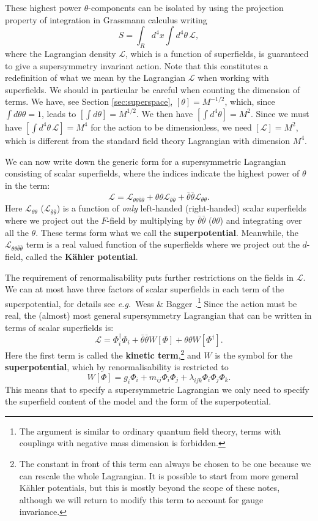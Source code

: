 \documentclass[notes.tex]{subfiles}
\begin{document}
These highest power $\theta$-components can be isolated by using the projection property of integration in Grassmann calculus writing
\[S=\int_R d^4x \int d^4\theta\, \mathcal{L},\]
where the Lagrangian density $\mathcal{L}$, which is a function of superfields, is guaranteed to give a supersymmetry invariant action. Note that this constitutes a redefinition of what we mean by the Lagrangian $\mathcal{L}$ when working with superfields. We should in particular be careful when counting the dimension of terms. We have, see Section \ref{sec:superspace}, $[\theta] = M^{-1/2}$, which, since $\int d\theta \theta=1$, leads to $[\int d\theta]=M^{1/2}$. We then have $[\int d^4\theta] = M^2$. Since we must have $[\int d^4\theta\, \mathcal{L}] = M^4$ for the action to be dimensionless, we need $[\mathcal{L}]=M^2$, which is different from the standard field theory Lagrangian with dimension $M^4$.

We can now write down the generic form for a supersymmetric Lagrangian consisting of scalar superfields, where the indices indicate the highest power of $\theta$ in the term:
\[\mathcal{L} = \mathcal{L}_{\theta \theta \bar{\theta} \bar{\theta}} + \theta\theta \mathcal{L}_{\bar{\theta}\bar{\theta}} + \bar{\theta}\bar{\theta}\mathcal{L}_{\theta\theta}.\]
Here $\mathcal{L}_{\theta\theta}$ ($\mathcal{L}_{\bar{\theta}\bar{\theta}}$)  is a function of {\it only}  left-handed (right-handed) scalar superfields where we project out the $F$-field by multiplying by $\bar{\theta}\bar{\theta}$ ($\theta\theta$) and integrating over all the $\theta$. These terms form what we call the {\bf superpotential}.
Meanwhile, the $\mathcal{L}_{\theta \theta \bar{\theta} \bar{\theta}}$ term is a real valued function of the superfields where we project out the $d$-field, called the {\bf Kähler potential}.

The requirement of renormalisability puts further restrictions on the fields in $\mathcal{L}$. We can at most have three factors of scalar superfields in each term of the superpotential, for details see {\it e.g.}\ Wess \& Bagger \cite{Bagger:1983mv}.\footnote{The argument is similar to ordinary quantum field theory, terms with couplings with negative mass dimension is forbidden.}  Since the action must be real, the (almost) most general supersymmetry Lagrangian that can be written in terms of scalar superfields is:
\[\mathcal{L} = \Phi^\dagger_i\Phi_i + \bar{\theta}\bar{\theta}W[\Phi] + \theta\theta W[\Phi^\dagger].\]
Here the first term is called the {\bf kinetic term},\footnote{The constant in front of this term can always be chosen to be one because we can rescale the whole Lagrangian. It is possible to start from more general Kähler potentials, but this is mostly beyond the scope of these notes, although we will return to modify this term to account for gauge invariance.} and $W$ is the symbol for the {\bf superpotential}, which by renormalisability is restricted to
\begin{equation}
W[\Phi] = g_i \Phi_i + m_{ij}\Phi_i \Phi_j + \lambda_{ijk} \Phi_i \Phi_j \Phi_k.
\end{equation}
This means that to specify a supersymmetric Lagrangian we only need to specify the superfield content of the model and the form of the superpotential. 
\end{document}
